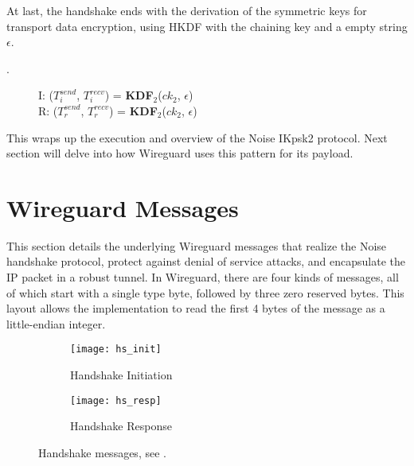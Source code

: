   At last, the handshake ends with the derivation of the symmetric keys for transport data encryption,
  using HKDF with the chaining key and a empty string $\epsilon$.
    \begin{center}
      \begin{varwidth}{\textwidth}
        \begin{description}
        \item[\textnormal{}.] 
              I: ($T^{send}_i$, $T^{recv}_i$) = \textbf{KDF}$_2$($ck_2$, $\epsilon$) \\
              R: ($T^{send}_r$, $T^{recv}_r$) = \textbf{KDF}$_2$($ck_2$, $\epsilon$)
        \addtocounter{cnt}{1}
        \end{description}
      \end{varwidth}
    \end{center}

  This wraps up the execution and overview of the Noise IKpsk2 protocol. Next section will delve 
  into how Wireguard uses this pattern for its payload.

\section{Wireguard Messages} \label{w3}
    This section details the underlying Wireguard messages that realize the Noise handshake protocol,
    protect against denial of service attacks, and encapsulate the IP packet in a robust tunnel. In  
    Wireguard, there are four kinds of messages, all of which start with a single type byte, followed
    by three zero reserved bytes. This layout allows the implementation to read the first 4 bytes
    of the message as a little-endian integer. 
    
    \begin{figure}[h]
      \centering
      \begin{subfigure}[b]{0.6\textwidth}
          \centering
          \texttt{[image: hs\_init]}
          \caption{Handshake Initiation}
          \label{fig:hsinit}
      \end{subfigure}
      \hfill
      \begin{subfigure}[b]{0.6\textwidth}
          \centering
          \texttt{[image: hs\_resp]}
          \caption{Handshake Response}
          \label{fig:hsresp}
      \end{subfigure}
      \caption{Handshake messages, see \cite[p.~10]{wireguard}.}
      \label{fig:hs}
    \end{figure} 

